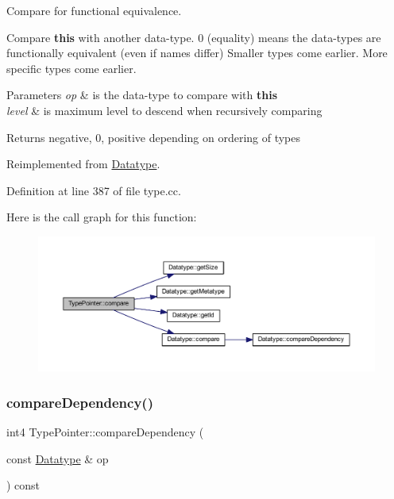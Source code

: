 Compare for functional equivalence. 

Compare {\bfseries{this}} with another data-\/type. 0 (equality) means the data-\/types are functionally equivalent (even if names differ) Smaller types come earlier. More specific types come earlier. 
\begin{DoxyParams}{Parameters}
{\em op} & is the data-\/type to compare with {\bfseries{this}} \\
\hline
{\em level} & is maximum level to descend when recursively comparing \\
\hline
\end{DoxyParams}
\begin{DoxyReturn}{Returns}
negative, 0, positive depending on ordering of types 
\end{DoxyReturn}


Reimplemented from \mbox{\hyperlink{class_datatype_a4d5a102b2d909180c3080fdb55d7b305}{Datatype}}.



Definition at line 387 of file type.\+cc.

Here is the call graph for this function\+:
\nopagebreak
\begin{figure}[H]
\begin{center}
\leavevmode
\includegraphics[width=350pt]{class_type_pointer_aba4a7c8c334a37a2225ec32c7328e402_cgraph}
\end{center}
\end{figure}
\mbox{\label{class_type_pointer_a20dfb07c24c08242c21ae856508197fe}} 
\subsubsection{\texorpdfstring{compareDependency()}{compareDependency()}}
{\footnotesize\ttfamily int4 Type\+Pointer\+::compare\+Dependency (\begin{DoxyParamCaption}\item[{const \mbox{\hyperlink{class_datatype}{Datatype}} \&}]{op }\end{DoxyParamCaption}) const\hspace{0.3cm}{\ttfamily [virtual]}}



